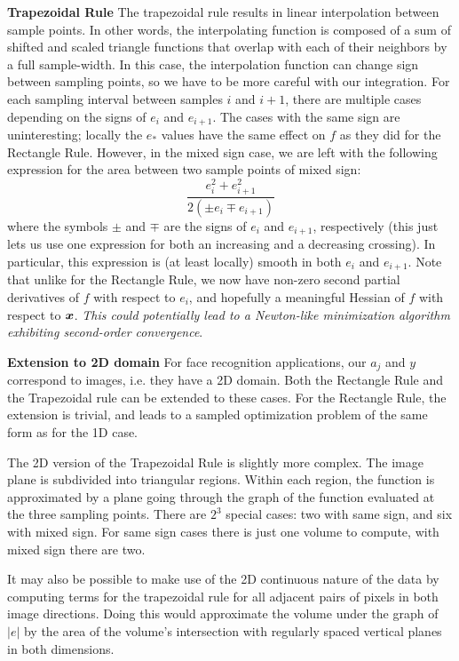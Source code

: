 \documentclass[12pt,journal,draftcls,letterpaper,onecolumn]{IEEEtran}
\begin{document}

{\bf Trapezoidal Rule}  The trapezoidal rule results in linear interpolation between sample points.  In other words, the interpolating function is composed of a sum of shifted and scaled triangle functions that overlap with each of their neighbors by a full sample-width.  In this case, the interpolation function can change sign between sampling points, so we have to be more careful with our integration.  For each sampling interval between samples $i$ and $i+1$, there are multiple cases depending on the signs of $e_i$ and $e_{i+1}$.  The cases with the same sign are uninteresting; locally the $e_*$ values have the same effect on $f$ as they did for the Rectangle Rule.  However, in the mixed sign case, we are left with the following expression for the area between two sample points of mixed sign:
\begin{equation}\label{eqn:trapezoid_smoothing}
 \frac{e_i^2 + e_{i+1}^2}{2(\pm e_i \mp e_{i+1})}
\end{equation}
where the symbols $\pm$ and $\mp$ are the signs of $e_i$ and $e_{i+1}$, respectively (this just lets us use one expression for both an increasing and a decreasing crossing).  In particular, this expression is (at least locally) smooth in both $e_i$ and $e_{i+1}$.  Note that unlike for the Rectangle Rule, we now have non-zero second partial derivatives of $f$ with respect to $e_i$, and hopefully a meaningful Hessian of $f$ with respect to ${\boldsymbol{x}}$.  {\em This could potentially lead to a Newton-like minimization algorithm exhibiting second-order convergence}.  




{\bf Extension to 2D domain} For face recognition applications, our $a_j$ and $y$ correspond to images, i.e. they have a 2D domain.  Both the Rectangle Rule and the Trapezoidal rule can be extended to these cases.  For the Rectangle Rule, the extension is trivial, and leads to a sampled optimization problem of the same form as for the 1D case.  

The 2D version of the Trapezoidal Rule is slightly more complex.  The image plane is subdivided into triangular regions.  Within each region, the function is approximated by a plane going through the graph of the function evaluated at the three sampling points.  There are $2^3$ special cases: two with same sign, and six with mixed sign.  For same sign cases there is just one volume to compute, with mixed sign there are two.  

It may also be possible to make use of the 2D continuous nature of the data by computing terms for the trapezoidal rule for all adjacent pairs of pixels in both image directions.  Doing this would approximate the volume under the graph of $|e|$ by the area of the volume's intersection with regularly spaced vertical planes in both dimensions.  
\end{document}
